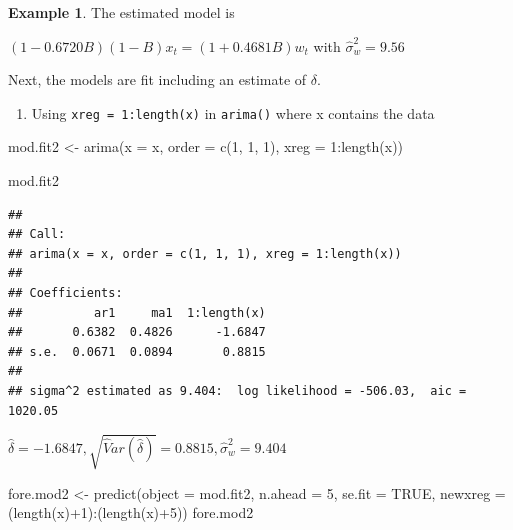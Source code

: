 \documentclass[
]{book}
\newenvironment{Shaded}{\begin{snugshade}}{\end{snugshade}}
\newcommand{\AttributeTok}[1]{\textcolor[rgb]{0.77,0.63,0.00}{#1}}
\newcommand{\ConstantTok}[1]{\textcolor[rgb]{0.00,0.00,0.00}{#1}}
\newcommand{\DecValTok}[1]{\textcolor[rgb]{0.00,0.00,0.81}{#1}}
\newcommand{\FunctionTok}[1]{\textcolor[rgb]{0.00,0.00,0.00}{#1}}
\newcommand{\NormalTok}[1]{#1}
\newcommand{\OtherTok}[1]{\textcolor[rgb]{0.56,0.35,0.01}{#1}}
\newcommand{\SpecialCharTok}[1]{\textcolor[rgb]{0.00,0.00,0.00}{#1}}
\providecommand{\tightlist}{%
  \setlength{\itemsep}{0pt}\setlength{\parskip}{0pt}}
\theoremstyle{definition}
\theoremstyle{definition}
\newtheorem{example}{Example}[chapter]
\theoremstyle{definition}
\theoremstyle{definition}
\theoremstyle{remark}
\begin{document}
\begin{example}
The estimated model is

\((1 - 0.6720B)(1 - B)x_t = (1 + 0.4681B)w_t\) with \(\hat \sigma_w^2= 9.56\)

Next, the models are fit including an estimate of \(\delta\).

\begin{enumerate}
\def\labelenumi{\arabic{enumi}.}
\tightlist
\item
  Using \texttt{xreg\ =\ 1:length(x)} in \texttt{arima()} where x contains the data
\end{enumerate}

\begin{Shaded}
\begin{Highlighting}[]
\NormalTok{mod.fit2 }\OtherTok{\textless{}{-}} \FunctionTok{arima}\NormalTok{(}\AttributeTok{x =}\NormalTok{ x, }\AttributeTok{order =} \FunctionTok{c}\NormalTok{(}\DecValTok{1}\NormalTok{, }\DecValTok{1}\NormalTok{, }\DecValTok{1}\NormalTok{), }\AttributeTok{xreg =} 
    \DecValTok{1}\SpecialCharTok{:}\FunctionTok{length}\NormalTok{(x))}

\NormalTok{mod.fit2}
\end{Highlighting}
\end{Shaded}

\begin{verbatim}
## 
## Call:
## arima(x = x, order = c(1, 1, 1), xreg = 1:length(x))
## 
## Coefficients:
##          ar1     ma1  1:length(x)
##       0.6382  0.4826      -1.6847
## s.e.  0.0671  0.0894       0.8815
## 
## sigma^2 estimated as 9.404:  log likelihood = -506.03,  aic = 1020.05
\end{verbatim}

\(\hat \delta=-1.6847, \sqrt{\hat Var(\hat \delta)}=0.8815, \hat \sigma_w^2=9.404\)

\begin{Shaded}
\begin{Highlighting}[]
\NormalTok{fore.mod2 }\OtherTok{\textless{}{-}} \FunctionTok{predict}\NormalTok{(}\AttributeTok{object =}\NormalTok{ mod.fit2, }\AttributeTok{n.ahead =} \DecValTok{5}\NormalTok{, }
    \AttributeTok{se.fit =} \ConstantTok{TRUE}\NormalTok{, }\AttributeTok{newxreg =}\NormalTok{ (}\FunctionTok{length}\NormalTok{(x)}\SpecialCharTok{+}\DecValTok{1}\NormalTok{)}\SpecialCharTok{:}\NormalTok{(}\FunctionTok{length}\NormalTok{(x)}\SpecialCharTok{+}\DecValTok{5}\NormalTok{))}
\NormalTok{fore.mod2}
\end{Highlighting}
\end{Shaded}


\end{example}
\end{document}
